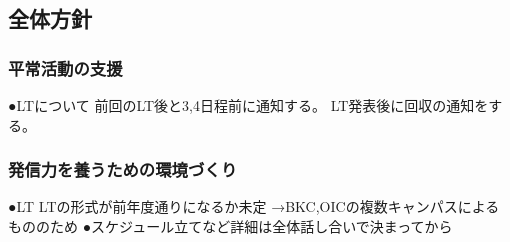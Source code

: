 \subsection*{全体方針}


\subsubsection*{平常活動の支援}
●LTについて
 前回のLT後と3,4日程前に通知する。
 LT発表後に回収の通知をする。

\subsubsection*{発信力を養うための環境づくり}
●LT 
 LTの形式が前年度通りになるか未定
  →BKC,OICの複数キャンパスによるもののため
  ●スケジュール立てなど詳細は全体話し合いで決まってから
